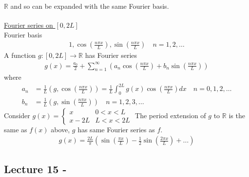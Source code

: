 \documentclass[12pt, letterpaper]{article}
\begin{document}
$\mathbb{R}$ and so can be expanded with the same Fourier basis. \\ \\
\underline{Fourier series on $[0,2L]$} \\
Fourier basis 
\begin{align*}
    1,\cos\left(\frac{n\pi x}{L}\right),\sin\left(\frac{n\pi x}{L}\right)\quad n =1,2,\dots
\end{align*}
A function $g:[0,2L]\rightarrow \mathbb{R}$ has Fourier series 
\begin{align*}
    g(x) = \frac{a_0}{2} + \sum_{n=1}^{\infty}\left(a_n\cos\left(\frac{n\pi x}{L}\right)+b_n\sin\left(\frac{n\pi x}{L}\right)\right)
\end{align*}
where 
\begin{align*}
    a_n &= \frac 1L\left(g,\cos\left(\frac{n\pi x}{L}\right)\right) = \frac 1L \int_{0}^{2L} g(x)\cos\left(\frac{n\pi x}{L}\right)dx \quad n = 0,1,2,\dots \\
    b_n &= \frac 1L\left(g,\sin\left(\frac{n\pi x}{L}\right)\right) \quad n = 1,2,3,\dots
\end{align*}
 Consider $g(x) = \begin{cases}
    x & 0 < x < L \\
    x - 2L & L < x < 2L
\end{cases}$
The period extension of $g$ to $\mathbb{R}$ is the same as $f(x)$ above, $g$ has same Fourier series
as $f$.
\begin{align*}
    g(x) = \frac{2L}{\pi} \left(\sin\left(\frac{\pi x}{L}\right)-\frac 12\sin\left(\frac{2\pi x}{L}\right)+\dots\right)
\end{align*}

\subsection{Lecture 15 -}
\end{document}
